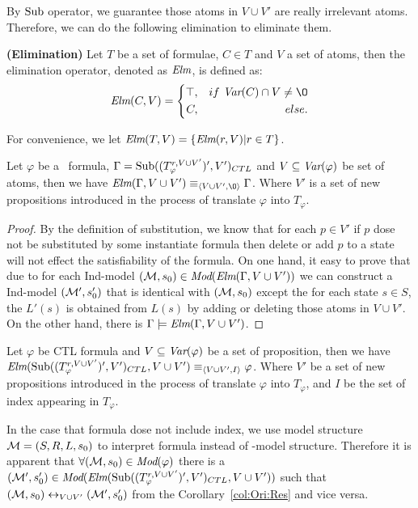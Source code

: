 \documentclass{article}
\begin{document}
By $\textrm{Sub}$ operator, we guarantee those atoms in $V\cup V'$ are really irrelevant atoms. Therefore, we can do the following elimination to eliminate them.
\begin{definition}\label{def:Elm}
\textbf{(Elimination)}
Let $T$ be a set of formulae, $C \in T$ and $V$ a set of atoms, then the elimination operator, denoted as $\textit{Elm}$, is defined as:
$$ \Elm(C, V)=\left\{
\begin{aligned}
\top, && if\ \Var(C) \cap V \neq {\O} \\
C, && else.
\end{aligned}
\right.
$$
\end{definition}
For convenience, we let $\textit{Elm}(T, V) = \{\textit{Elm}(r, V) | r \in T\}$.

\begin{proposition}
Let $\varphi$ be a \CTL\ formula, $\Gamma=\textrm{Sub}((T_{\varphi}^{r,V \cup V'})', V')_{CTL}$ and $V \subseteq \textit{Var}(\varphi)$ be set of atoms, then we have $\Elm (\Gamma, V \cup V') \equiv_{\tuple{V \cup V', {\O}}} \Gamma$.
Where $V'$ is a set of new propositions introduced in the process of translate $\varphi$ into $T_{\varphi}$.
\end{proposition}
\begin{proof}
By the definition of substitution, we know that for each $p\in V'$ if $p$ dose not be substituted by some instantiate formula then delete or add $p$ to a state will not effect the satisfiability of the formula. On one hand, it easy to prove that due to for each Ind-model $({\cal M}, s_0)\in \textit{Mod}(\textit{Elm} (\Gamma, V \cup V'))$ we can construct a Ind-model $({\cal M}',s_0')$ that is identical with $({\cal M}, s_0)$ except the for each state $s\in S$, the $L'(s)$ is obtained from $L(s)$ by adding or deleting those atoms  in $V\cup V'$.
On the other hand, there is $\Gamma \models \textit{Elm} (\Gamma, V \cup V')$.
\end{proof}



\begin{corollary}\label{col:Ori:Res}
Let $\varphi$ be CTL formula and $V\subseteq \textit{Var}(\varphi)$ be a set of proposition, then we have $\textit{Elm} (\textrm{Sub}((T_{\varphi}^{r,V \cup V'})', V')_{CTL}, V \cup V') \equiv_{{\langle{V \cup V', I}\rangle}} \varphi$.
Where $V'$ be a set of new propositions introduced in the process of translate $\varphi$ into $T_{\varphi}$, and $I$ be the set of index appearing in $T_{\varphi}$.
\end{corollary}

In the case that formula dose not include index, we use model structure ${\cal M}=(S,R,L, s_0)$ to interpret formula instead of \Ind-model structure. Therefore it is apparent that $\forall ({\cal M},s_0) \in \textit{Mod}(\varphi)$ there is a $({\cal M}',s_0') \in \textit{Mod}(\textit{Elm} (\textrm{Sub}((T_{\varphi}^{r,V \cup V'})', V')_{CTL}, V \cup V'))$ such that $({\cal M},s_0) \leftrightarrow_{V \cup V'} ({\cal M}',s_0')$ from the Corollary~\ref{col:Ori:Res} and vice versa.
\end{document}
